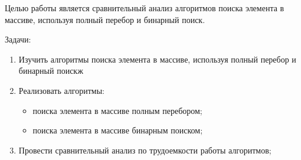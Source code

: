 
Целью работы является сравнительный анализ алгоритмов поиска элемента в массиве, используя полный перебор и бинарный поиск.

Задачи:
\begin{enumerate}[label={\arabic*)}]
	\item Изучить алгоритмы поиска элемента в массиве, используя полный перебор и бинарный поискж
	\item Реализовать алгоритмы:
	\begin{itemize}[label=---]
		\item поиска элемента в массиве полным перебором;
		\item поиска элемента в массиве бинарным поиском;
	\end{itemize}
	\item Провести сравнительный анализ по трудоемкости работы алгоритмов;
\end{enumerate}

\clearpage
